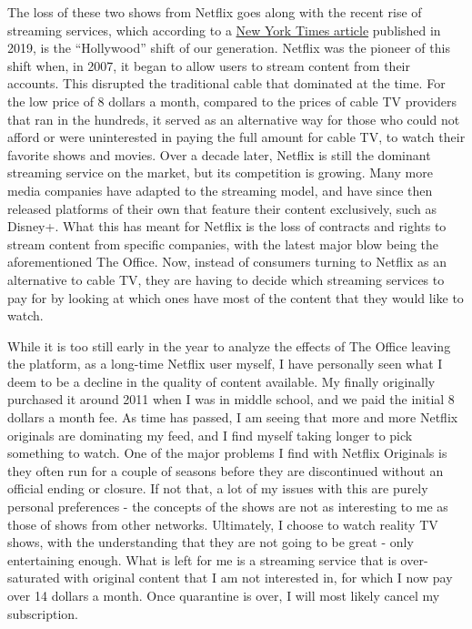 \documentclass[
]{article}
\begin{document}
The loss of these two shows from Netflix goes along with the recent rise
of streaming services, which according to a
\href{https://www.nytimes.com/2019/11/18/business/media/streaming-hollywood-revolution.html}{New
York Times article} published in 2019, is the ``Hollywood'' shift of our
generation. Netflix was the pioneer of this shift when, in 2007, it
began to allow users to stream content from their accounts. This
disrupted the traditional cable that dominated at the time. For the low
price of 8 dollars a month, compared to the prices of cable TV providers
that ran in the hundreds, it served as an alternative way for those who
could not afford or were uninterested in paying the full amount for
cable TV, to watch their favorite shows and movies. Over a decade later,
Netflix is still the dominant streaming service on the market, but its
competition is growing. Many more media companies have adapted to the
streaming model, and have since then released platforms of their own
that feature their content exclusively, such as Disney+. What this has
meant for Netflix is the loss of contracts and rights to stream content
from specific companies, with the latest major blow being the
aforementioned The Office. Now, instead of consumers turning to Netflix
as an alternative to cable TV, they are having to decide which streaming
services to pay for by looking at which ones have most of the content
that they would like to watch.

While it is too still early in the year to analyze the effects of The
Office leaving the platform, as a long-time Netflix user myself, I have
personally seen what I deem to be a decline in the quality of content
available. My finally originally purchased it around 2011 when I was in
middle school, and we paid the initial 8 dollars a month fee. As time
has passed, I am seeing that more and more Netflix originals are
dominating my feed, and I find myself taking longer to pick something to
watch. One of the major problems I find with Netflix Originals is they
often run for a couple of seasons before they are discontinued without
an official ending or closure. If not that, a lot of my issues with this
are purely personal preferences - the concepts of the shows are not as
interesting to me as those of shows from other networks. Ultimately, I
choose to watch reality TV shows, with the understanding that they are
not going to be great - only entertaining enough. What is left for me is
a streaming service that is over-saturated with original content that I
am not interested in, for which I now pay over 14 dollars a month. Once
quarantine is over, I will most likely cancel my subscription.
\end{document}
